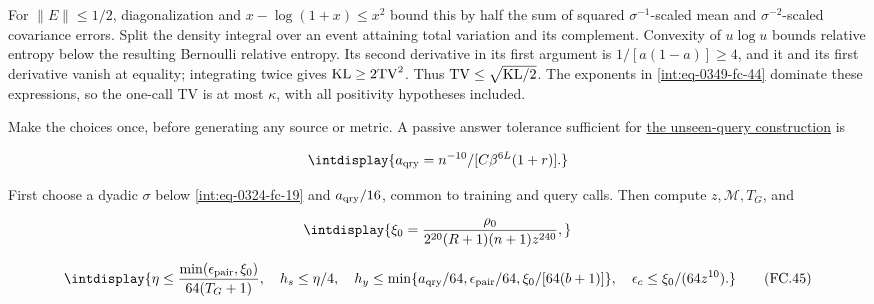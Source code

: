 
For \(\|E\|\le1/2\), diagonalization and \(x-\log(1+x)\le x^2\) bound this by half the sum of squared \(\sigma^{-1}\)-scaled mean and \(\sigma^{-2}\)-scaled covariance errors. Split the density integral over an event attaining total variation and its complement. Convexity of \(u\log u\) bounds relative entropy below the resulting Bernoulli relative entropy. Its second derivative in its first argument is \(1/[a(1-a)]\ge4\), and it and its first derivative vanish at equality; integrating twice gives \({\rm KL}\ge2{\rm TV}^2\). Thus \({\rm TV}\le\sqrt{{\rm KL}/2}\). The exponents in \eqref{int:eq-0349-fc-44} dominate these expressions, so the one-call TV is at most \(\kappa\), with all positivity hypotheses included.



Make the choices once, before generating any source or metric. A passive answer tolerance sufficient for \hyperref[int:decoder-passive-query]{the unseen-query construction} is


\begingroup\renewcommand{\theHequation}{intdisplay.748}
\begin{equation*}
\intdisplay{
a_{\rm qry}=n^{-10}/[C\beta^{6L}(1+r)].
}
\end{equation*}
\endgroup


First choose a dyadic \(\sigma\) below \eqref{int:eq-0324-fc-19} and \(a_{\rm qry}/16\), common to training and query calls. Then compute \(z,\allowbreak \mathcal M,\allowbreak T_G\), and


\begingroup\renewcommand{\theHequation}{intdisplay.749}
\begin{equation*}
\intdisplay{
\xi_0=\frac{\rho_0}{2^{20}(R+1)(n+1)z^{240}},
}
\end{equation*}
\endgroup

\begingroup\renewcommand{\theHequation}{intdisplay.750}
\begin{equation}
\intdisplay{
\eta\le\frac{\min(\epsilon_{\rm pair},\xi_0)}{64(T_G+1)},\quad
h_s\le\eta/4,\quad
h_y\le\min\{a_{\rm qry}/64,\epsilon_{\rm pair}/64,
\xi_0/[64(b+1)]\},\quad
\epsilon_c\le\xi_0/(64z^{10}).
}
\tag{FC.45}
\label{int:eq-0350-fc-45}
\end{equation}
\endgroup


